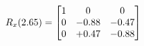 \documentclass[preview]{standalone}
\begin{document}
\begin{align*}
\special{dvisvgm:raw <g id='unique000'>}R_{x}(2.65) = \begin{bmatrix}1 & 0 & 0 \\0 & -0.88 & -0.47 \\0 & +0.47 & -0.88\end{bmatrix}\special{dvisvgm:raw </g>}
\end{align*}
\end{document}
